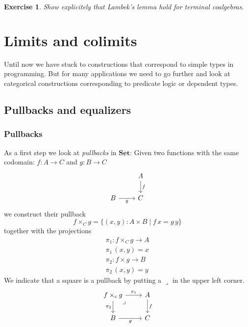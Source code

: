 \documentclass{article}
\newcommand{\cat}[1]{\underline{\mathbf{#1}}}
\newtheorem{exercise}{Exercise}
\begin{document}
\begin{exercise}
  Show explicitely that Lambek's lemma hold for terminal coalgebras.
\end{exercise}

\newpage
\section{Limits and colimits}
\label{sec:limits-colimits}

Until now we have stuck to constructions that correspond to simple types in programming. But for many applications we need to go further and look at categorical constructions corresponding to predicate logic or dependent types.

\subsection{Pullbacks and equalizers}
\label{sec:pullbacks-equalizers}

\subsubsection*{Pullbacks}
\label{sec:pullbacks}

As a first step we look at \emph{pullbacks} in $\cat{Set}$: Given two functions with the same codomain: $f : A \to C$ and $g : B \to C$ 
\[\begin{tikzcd}
& A \arrow[d,"f"] \\
B \arrow[r,"g" below] &C 
\end{tikzcd}\]
we construct their pullback 
\[ f \times_C g = \{ (x,y) : A \times B \mid f\,x = g\,y \} \]
together with the projections
\begin{align*}
\pi_1 : f \times_C g \to A \\
\pi_1\,(x,y) = x \\
\pi_2 : f \times g \to B \\
\pi_2\,(x,y) = y 
\end{align*}
We indicate that a square is a pullback by putting a $\lrcorner$ in the upper left corner.
\[\begin{tikzcd}
f \times_c g \arrow[r,"\pi_1"] \arrow[d,"\pi_2" left] \arrow[dr, phantom, "\lrcorner", very near start]
    & A \arrow[d,"f"] \\
B \arrow[r,"g" below] &C 
\end{tikzcd}\]
\end{document}
